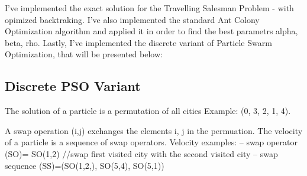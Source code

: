 

I've implemented the exact solution for the Travelling Salesman Problem - with opimized backtraking.
I've also implemented the standard Ant Colony Optimization algorithm and applied it in order to find the best parametrs alpha, beta, rho.
Lastly, I've implemented the discrete variant of Particle Swarm Optimization, that will be presented below:

\subsection{Discrete PSO Variant}

The solution of a particle is a permutation of all cities Example: (0, 3, 2, 1, 4).

A swap operation (i,j) exchanges the elements i, j in the permuation.
The velocity of a particle is a sequence of swap operators.
Velocity examples: – swap operator (SO)= SO(1,2) //swap first visited city with the second visited city – swap sequence (SS)=(SO(1,2,), SO(5,4), SO(5,1))


